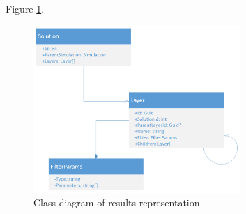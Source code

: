 
Figure \ref{fig:results-class-diagram}.

\begin{figure}[H]
    \centering
    \includegraphics[width=0.7\textwidth]{figures/results-class-diagram}
    \decoRule
    \caption{Class diagram of results representation}
    \label{fig:results-class-diagram}
\end{figure}